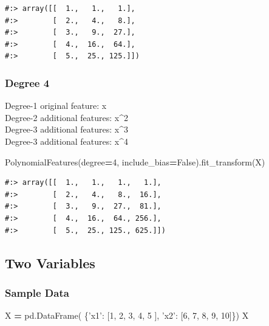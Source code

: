 \documentclass[
]{book}
\newenvironment{Shaded}{\begin{snugshade}}{\end{snugshade}}
\newcommand{\DecValTok}[1]{\textcolor[rgb]{0.06,0.06,0.06}{#1}}
\newcommand{\NormalTok}[1]{#1}
\newcommand{\OperatorTok}[1]{\textcolor[rgb]{0.43,0.43,0.43}{\textbf{#1}}}
\newcommand{\StringTok}[1]{\textcolor[rgb]{0.5,0.5,0.5}{#1}}
\newcommand{\VariableTok}[1]{\textcolor[rgb]{0,0,0}{#1}}
\begin{document}
\begin{verbatim}
#:> array([[  1.,   1.,   1.],
#:>        [  2.,   4.,   8.],
#:>        [  3.,   9.,  27.],
#:>        [  4.,  16.,  64.],
#:>        [  5.,  25., 125.]])
\end{verbatim}

\hypertarget{degree-4}{%
\subsubsection{Degree 4}\label{degree-4}}

Degree-1 original feature: x\\
Degree-2 additional features: x\^{}2\\
Degree-3 additional features: x\^{}3\\
Degree-3 additional features: x\^{}4

\begin{Shaded}
\begin{Highlighting}[]
\NormalTok{PolynomialFeatures(degree}\OperatorTok{=}\DecValTok{4}\NormalTok{, include_bias}\OperatorTok{=}\VariableTok{False}\NormalTok{).fit_transform(X)}
\end{Highlighting}
\end{Shaded}

\begin{verbatim}
#:> array([[  1.,   1.,   1.,   1.],
#:>        [  2.,   4.,   8.,  16.],
#:>        [  3.,   9.,  27.,  81.],
#:>        [  4.,  16.,  64., 256.],
#:>        [  5.,  25., 125., 625.]])
\end{verbatim}

\hypertarget{two-variables}{%
\subsection{Two Variables}\label{two-variables}}

\hypertarget{sample-data-22}{%
\subsubsection{Sample Data}\label{sample-data-22}}

\begin{Shaded}
\begin{Highlighting}[]
\NormalTok{X }\OperatorTok{=}\NormalTok{ pd.DataFrame( \{}\StringTok{'x1'}\NormalTok{: [}\DecValTok{1}\NormalTok{, }\DecValTok{2}\NormalTok{, }\DecValTok{3}\NormalTok{, }\DecValTok{4}\NormalTok{, }\DecValTok{5}\NormalTok{ ],}
                   \StringTok{'x2'}\NormalTok{: [}\DecValTok{6}\NormalTok{, }\DecValTok{7}\NormalTok{, }\DecValTok{8}\NormalTok{, }\DecValTok{9}\NormalTok{, }\DecValTok{10}\NormalTok{]\})}
\NormalTok{X}
\end{Highlighting}
\end{Shaded}
\end{document}
